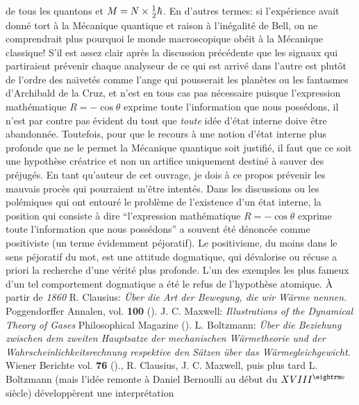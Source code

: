 de tous les quantons et $M = N \times {1\over 2}\hbar$. 
\medskip
En d'autres termes:  si l'exp\'erience avait donn\'e tort \`a la M\'ecanique
quantique et raison \`a l'in\'egalit\'e de Bell, on ne comprendrait plus
pourquoi le monde macroscopique ob\'eit \`a la M\'ecanique classique!  
\medskip 
S'il est assez clair apr\`es la discussion pr\'ec\'edente que les signaux 
qui partiraient pr\'evenir chaque analyseur de ce qui est arriv\'e dans 
l'autre est plut\^ot de l'ordre des na\"\i vet\'es comme l'ange qui 
pousserait les plan\`etes ou les fantasmes d'Archibald de la Cruz,  et 
n'est en tous cas pas n\'ecessaire puisque l'expression math\'ematique 
$R = -\cos\theta$ exprime toute l'information que nous poss\'edons,  il  
n'est par contre pas \'evident du tout que {\it toute} id\'ee  d'\'etat   
interne doive \^etre abandonn\'ee.  Toutefois, pour que le recours \`a une 
notion d'\'etat interne plus profonde que ne le permet la M\'ecanique 
quantique soit justifi\'e, il faut que ce soit une hypoth\`ese cr\'eatrice 
et non un artifice uniquement destin\'e \`a sauver des pr\'ejug\'es. 
\medskip 
En tant qu'auteur de cet ouvrage,  je dois \`a ce propos pr\'evenir les  
mauvais proc\`es qui pourraient m'\^etre intent\'es.  Dans les discussions 
ou les pol\'emiques qui ont entour\'e le probl\`eme de l'existence d'un 
\'etat interne,  la position qui consiste \`a dire ``l'expression 
math\'ematique $R = -\cos\theta$ exprime toute l'information que nous 
poss\'edons'' a souvent \'et\'e d\'enonc\'ee comme positiviste (un terme  
\'evidemment p\'ejoratif).  Le positivisme, du moins dans le sens 
p\'ejoratif du mot,  est une attitude dogmatique,  qui d\'evalorise ou 
r\'ecuse a priori la recherche d'une v\'erit\'e plus profonde.  
\medskip 
L'un des exemples les plus fameux d'un tel comportement dogmatique a
\'et\'e le refus de l'hypoth\`ese atomique. \`A partir de {\it 1860}
{R. Clausius: {\it \"Uber die Art der Bewegung, die wir W\"arme nennen.}
Poggendorffer Annalen, vol. {\bf 100} ({}). 
\smallskip
J. C. Maxwell: {\it Illustrations of the Dynamical Theory of Gases}
Philosophical Magazine ({}). 
\smallskip
L. Boltzmann: {\it \"Uber die Beziehung zwischen dem zweiten Hauptsatze
der mechanischen W\"armetheorie und der Wahrscheinlichkeitsrechnung
respektive den S\"atzen \"uber das W\"armegleichgewicht}.  Wiener
Berichte vol. {\bf 76} ({}).},  R. Clausius,  J. C. Maxwell, 
puis plus tard L. Boltzmann (mais l'id\'ee  remonte \`a Daniel Bernoulli au
d\'ebut du $XVIII^{\rm e}$ si\`ecle) d\'evelopp\`erent une interpr\'etation
